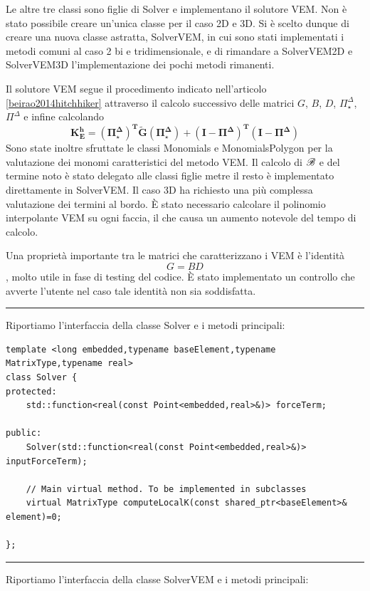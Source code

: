 \documentclass[oneside,12pt]{book}  %
\theoremstyle{plain}
\theoremstyle{definition}
\theoremstyle{remark}
\numberwithin{equation}{chapter} %
\begin{document}
Le altre tre classi sono figlie di Solver e implementano il solutore
VEM. Non \`e stato possibile creare un'unica classe per il caso 2D e
3D. Si \`e scelto dunque di creare una nuova classe astratta,
SolverVEM, in cui sono stati implementati i metodi comuni al caso 2 bi
e tridimensionale, e di rimandare a SolverVEM2D e SolverVEM3D
l'implementazione dei pochi metodi rimanenti. 

Il solutore VEM segue il procedimento indicato nell'articolo
\ref{beirao2014hitchhiker} attraverso il calcolo successivo delle
matrici $G$, $B$, $D$, $\Pi^\Delta_\star$, $\Pi^\Delta$ e infine
calcolando $$ \mathbf{K_E^h= (\Pi^\Delta_\star)^T \tilde{G}
  (\Pi^\Delta_\star)+(I-\Pi^\Delta)^T (I-\Pi^\Delta)} $$ 
Sono state inoltre sfruttate le classi Monomials e MonomialsPolygon
per la valutazione dei monomi caratteristici del metodo VEM. 
Il calcolo di $\mathscr{B}$ e del termine noto \`e stato delegato alle classi
figlie metre il resto \`e implementato direttamente in SolverVEM. Il
caso 3D ha richiesto una pi\`u complessa valutazione dei termini al
bordo. \`E stato necessario calcolare il polinomio interpolante VEM su
ogni faccia, il che causa un aumento notevole del tempo di calcolo.

Una propriet\`a importante tra le matrici che caratterizzano i VEM \`e
l'identit\`a $$G=BD$$, molto utile in fase di testing del codice. \`E
stato implementato un controllo che avverte l'utente nel caso tale
identit\`a non sia soddisfatta.

\noindent\rule{14cm}{1pt}

Riportiamo l'interfaccia della classe Solver e i metodi principali:

\begin{verbatim}
template <long embedded,typename baseElement,typename MatrixType,typename real>
class Solver {
protected:
    std::function<real(const Point<embedded,real>&)> forceTerm;
	
public:
    Solver(std::function<real(const Point<embedded,real>&)> inputForceTerm);

    // Main virtual method. To be implemented in subclasses
    virtual MatrixType computeLocalK(const shared_ptr<baseElement>& element)=0;
	
};

\end{verbatim}

\noindent\rule{14cm}{1pt}

Riportiamo l'interfaccia della classe SolverVEM e i metodi principali:
\end{document}
